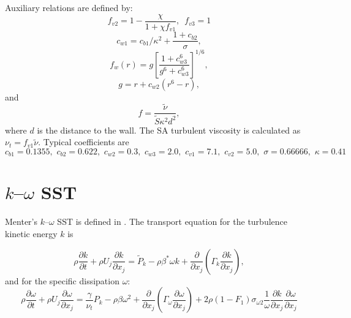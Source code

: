 Auxiliary relations are defined by:
\begin{equation}
    f_{v2} = 1 - \frac{\chi}{1 + \chi f_{v1}}, \, \, \,
    f_{v3} = 1
\end{equation}
\begin{equation}
    c_{w1} = c_{b1}/\kappa^2 + \frac{1 + c_{b2}}{\sigma},
\end{equation}
\begin{equation}
    f_w(r) = g \left[ \frac{1 + c_{w3}^6}{g^6 + c_{w3}^6} \right]^{1/6},
\end{equation}
\begin{equation}
    g = r + c_{w2} (r^6 - r),
\end{equation}
and
\begin{equation}
    f = \frac{\tilde{\nu}}{\tilde{S} \kappa^2 d^2},
\end{equation}
where $d$ is the distance to the wall. The SA turbulent viscosity is calculated
as $\nu_t = f_{v1} \tilde{\nu}$. Typical coefficients are
\begin{equation}
    c_{b1} = 0.1355, \, \,
    c_{b2} = 0.622, \, \,
    c_{w2} = 0.3, \, \,
    c_{w3} = 2.0, \, \,
    c_{v1} = 7.1, \, \,
    c_{v2} = 5.0, \, \,
    \sigma = 0.66666, \, \,
    \kappa = 0.41
\end{equation}


\section{$k$--$\omega$ SST}

Menter's $k$--$\omega$ SST is defined in \cite{Menter2001}. The transport
equation for the turbulence kinetic energy $k$ is

\begin{equation}
    \rho \frac{\partial k}{\partial t}
    + \rho U_j \frac{\partial k}{\partial x_j}
    = \tilde{P}_k - \rho \beta^* \omega k
    + \frac{\partial}{\partial x_j}
    \left(
    \Gamma_k \frac{\partial k}{\partial x_j}
    \right),
    \label{eq:komegasst-k}
\end{equation}
and for the specific dissipation $\omega$:
\begin{equation}
    \rho \frac{\partial \omega}{\partial t}
    + \rho U_j \frac{\partial \omega}{\partial x_j}
    = \frac{\gamma}{\nu_t} P_k - \rho \beta \omega^2
    + \frac{\partial}{\partial x_j}
    \left(
    \Gamma_\omega \frac{\partial \omega}{\partial x_j}
    \right)
    + 2 \rho (1 - F_1) \sigma_{\omega 2}
    \frac{1}{\omega} \frac{\partial k}{\partial x_j}
    \frac{\partial \omega}{\partial x_j}
\end{equation}

